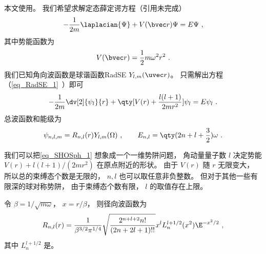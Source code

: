 
\begin{issues}
\issueDraft
\end{issues}


本文使用。 我们希望求解定态薛定谔方程（引用未完成）
\begin{equation}
-\frac{1}{2m} \laplacian {\Psi} + V(\bvec r)\Psi = E \Psi~,
\end{equation}
其中势能函数为
\begin{equation}
V(\bvec r) = \frac{1}{2}m\omega^2 r^2~.
\end{equation}
我们已知角向波函数是球谐函数{RadSE} $Y_{l,m}(\uvec r)$。 只需解出方程（\autoref{eq_RadSE_1}~）即可
\begin{equation}\label{eq_SHOSph_1}
-\frac{1}{2m} \dv[2]{\psi_l}{r} + \qty[V(r) + \frac{l(l + 1)}{2mr^2}]\psi_l = E\psi_l~.
\end{equation}
总波函数和能级为
\begin{equation}
\psi_{n,l,m} = R_{n,l}(r) Y_{l,m}(\Omega)~,
\qquad
E_{n,l} = \qty(2n + l + \frac32) \omega~.
\end{equation}    

我们可以把\autoref{eq_SHOSph_1} 想象成一个一维势阱问题， 角动量量子数 $l$ 决定势能 $V(r) + l(l + 1)/(2mr^2)$ 在原点附近的形状。 由于 $V(r)$ 随 $r$ 无限变大， 所以总的束缚态个数是无限的， $n, l$ 也可以取任意非负整数。 但对于其他一些有限深的球对称势阱， 由于束缚态个数有限， $l$ 的取值存在上限。

令 $\beta = 1/\sqrt{m\omega}$， $x = r/\beta$， 则径向波函数为
\begin{equation}
R_{n,l}(r) = \frac{1}{\beta^{3/2} \pi^{1/4}} \sqrt{\frac{2^{n+l+2} n!}{(2n + 2l + 1)!!}} x^l L_n^{l+1/2}(x^2) \E^{-x^2/2}~,
\end{equation}
其中 $L_n^{l+1/2}$ 是。

